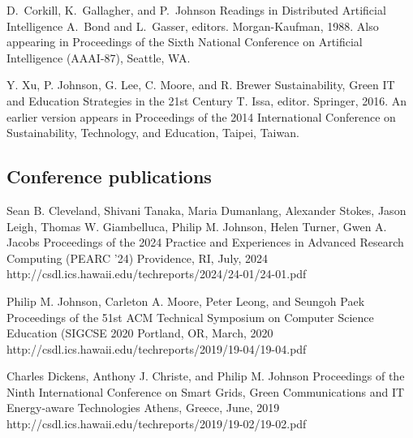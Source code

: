 \documentclass[11pt,letterpaper,sans]{moderncv} %
\begin{document}
          {D.~Corkill, K.~Gallagher, and P.~Johnson}
          {Readings in Distributed Artificial Intelligence}
          {A.~Bond and L.~Gasser, editors.  Morgan-Kaufman, 1988.  Also appearing in Proceedings of the Sixth National Conference on Artificial Intelligence (AAAI-87), Seattle, WA.}

          {Y. Xu, P.  Johnson, G. Lee, C. Moore, and R. Brewer}
          {Sustainability, Green IT and Education Strategies in the 21st Century}
          {T. Issa, editor.  Springer, 2016.  An earlier version appears in Proceedings of the 2014 International Conference on Sustainability, Technology, and Education, Taipei, Taiwan.}

\subsection{Conference publications}

          {Sean B. Cleveland, Shivani Tanaka, Maria Dumanlang, Alexander Stokes, Jason Leigh, Thomas W. Giambelluca, Philip M. Johnson, Helen Turner, Gwen A. Jacobs}
          {Proceedings of the 2024 Practice and Experiences in Advanced Research Computing (PEARC '24)}
          {Providence, RI, July, 2024}
          {http://csdl.ics.hawaii.edu/techreports/2024/24-01/24-01.pdf}

          {Philip M. Johnson, Carleton A. Moore, Peter Leong, and Seungoh Paek}
          {Proceedings of the 51st ACM Technical Symposium on Computer Science Education (SIGCSE 2020}
          {Portland, OR, March, 2020}
          {http://csdl.ics.hawaii.edu/techreports/2019/19-04/19-04.pdf}


          {Charles Dickens, Anthony J. Christe, and Philip M. Johnson}
          {Proceedings of the Ninth International Conference on Smart Grids, Green Communications and IT Energy-aware Technologies}
          {Athens, Greece, June, 2019}
          {http://csdl.ics.hawaii.edu/techreports/2019/19-02/19-02.pdf}
\end{document}
